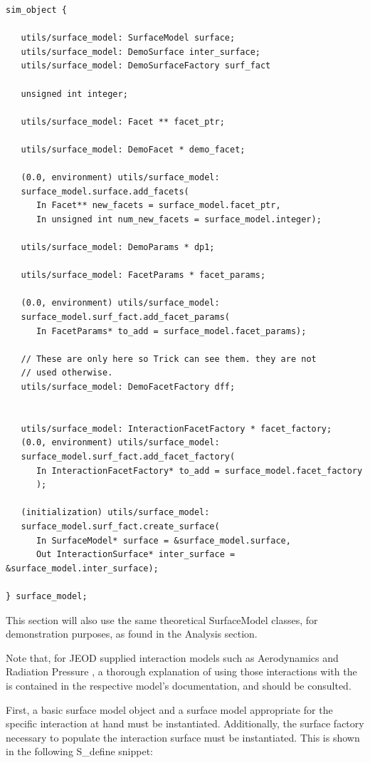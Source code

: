 \begin{verbatim}
sim_object { 

   utils/surface_model: SurfaceModel surface;
   utils/surface_model: DemoSurface inter_surface;
   utils/surface_model: DemoSurfaceFactory surf_fact

   unsigned int integer;

   utils/surface_model: Facet ** facet_ptr;

   utils/surface_model: DemoFacet * demo_facet;

   (0.0, environment) utils/surface_model:
   surface_model.surface.add_facets(
      In Facet** new_facets = surface_model.facet_ptr,
      In unsigned int num_new_facets = surface_model.integer);

   utils/surface_model: DemoParams * dp1;

   utils/surface_model: FacetParams * facet_params;

   (0.0, environment) utils/surface_model:
   surface_model.surf_fact.add_facet_params(
      In FacetParams* to_add = surface_model.facet_params);

   // These are only here so Trick can see them. they are not
   // used otherwise.
   utils/surface_model: DemoFacetFactory dff;


   utils/surface_model: InteractionFacetFactory * facet_factory;
   (0.0, environment) utils/surface_model:
   surface_model.surf_fact.add_facet_factory(
      In InteractionFacetFactory* to_add = surface_model.facet_factory
      );

   (initialization) utils/surface_model:
   surface_model.surf_fact.create_surface(
      In SurfaceModel* surface = &surface_model.surface,
      Out InteractionSurface* inter_surface = &surface_model.inter_surface);

} surface_model;
\end{verbatim}

This section will also use the same theoretical SurfaceModel
classes, for demonstration purposes, as found in the
Analysis section.

Note that, for JEOD supplied interaction models such as Aerodynamics
\cite{dynenv:AERODYNAMICS} and Radiation Pressure
\cite{dynenv:RADIATIONPRESSURE}, a thorough explanation of using
those interactions with the \ModelDesc is contained
in the respective model's documentation, and should be consulted.

First, a basic surface model object and a surface model appropriate
for the specific interaction at hand must be instantiated. Additionally,
the surface factory necessary to populate the interaction surface must
be instantiated. This is shown in the following S\_define snippet:

